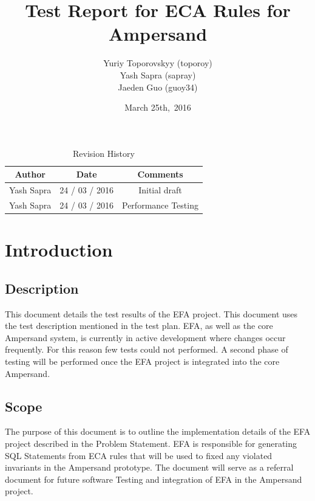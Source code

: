\documentclass[12pt, svgnames]{article}
\begin{document}
\title{\vspace*{3cm} Test Report for ECA Rules for Ampersand} 
\author{Yuriy Toporovskyy (toporoy)\\ Yash Sapra (sapray) \\ Jaeden Guo (guoy34)}
\date{March 25th,\ 2016} 


\maketitle
\newpage
\vspace*{1cm}
\begin{table}[ht!]\begin{center}
        \caption{Revision History}  
        \begin{tabular}{|c|c|c|}\hline
            \textbf{Author} & \textbf{Date} & \textbf{Comments} \\\hline 
            Yash Sapra & 24 / 03 / 2016 & Initial draft\\\hline
	    Yash Sapra & 24 / 03 / 2016 & Performance Testing\\\hline
        \end{tabular}
    \end{center}\end{table}
\newpage

\tableofcontents

\newpage

\section{Introduction}\label{intro}

\subsection{Description}

This document details the test results of the EFA project.
This document uses the test description mentioned in the test plan.
EFA, as well as the core Ampersand system, is
currently in active development where changes occur frequently.
For this reason few tests could not performed. 
A second phase of testing will be performed 
once the EFA project is integrated into the core Ampersand.

\subsection{Scope}
The purpose of this document is to outline the implementation details of the 
EFA project described in the Problem Statement.
EFA is responsible for generating SQL Statements from ECA rules that will 
be used to fixed any violated invariants in the Ampersand prototype. 
The document will serve as a referral document for future software Testing and integration of EFA in the Ampersand project.
\end{document}
